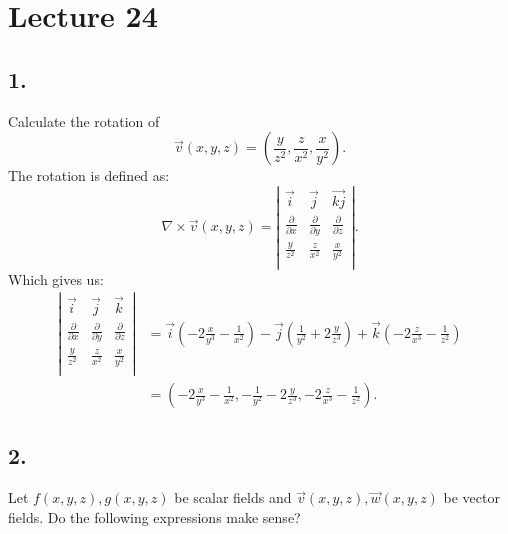 \section*{Lecture 24}

\subsection*{1.} Calculate the rotation of
\[ 
  \Vec{v} \left( x,y,z \right) = \left( \frac{y}{z^2}, \frac{z}{x^2}, \frac{x}{y^2} \right) 
.\]
\bigbreak
The rotation is defined as:
\[ 
\nabla \times \Vec{v}(x,y,z) = \left| \begin{array}{ccc}
\Vec{i} & \Vec{j} & \Vec{kj}\\
\frac{\partial }{\partial x} & \frac{\partial }{\partial y} & \frac{\partial }{\partial z}\\
\frac{y}{z^2} & \frac{z}{x^2} & \frac{x}{y^2}\\
\end{array} \right|
.\]
Which gives us:
\begin{align*}
 \left| \begin{array}{ccc}
\Vec{i} & \Vec{j} & \Vec{k}\\
\frac{\partial }{\partial x} & \frac{\partial }{\partial y} & \frac{\partial }{\partial z}\\
\frac{y}{z^2} & \frac{z}{x^2} & \frac{x}{y^2}\\
\end{array} \right| &= \Vec{i} \left( -2 \frac{x}{y^3} - \frac{1}{x^2} \right) - \Vec{j} \left( \frac{1}{y^2} + 2 \frac{y}{z^3} \right) + \Vec{k} \left( - 2 \frac{z}{x^3} - \frac{1}{z^2} \right) \\
&= \left( -2\frac{x}{y^3} - \frac{1}{x^2}, - \frac{1}{y^2} - 2 \frac{y}{z^3}, -2 \frac{z}{x^3} - \frac{1}{z^2} \right)
.\end{align*}

\subsection*{2.} Let $f \left( x,y,z \right) , g(x,y,z)$ be scalar fields and $\Vec{v}(x,y,z), \Vec{w}(x,y,z)$ be vector fields. Do the following expressions make sense?


